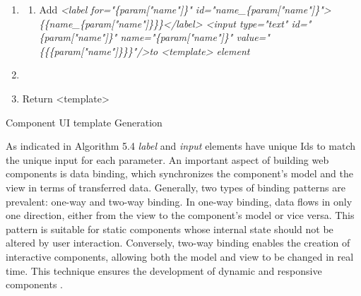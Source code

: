\setlength{\algomargin}{2em} %
\begin{algorithm}
	\DontPrintSemicolon
	\begin{enumerate}
	\item 
	{
		\begin{enumerate}
		\def\labelenumii{\alph{enumii}.}
		  \item
		    Add \emph{\textless label for="\{param{[}"name"{]}\}"
		    id="name\_\{param{[}"name"{]}\}"\textgreater\{\{name\_\{param{[}"name"{]}\}\}\}\textless/label\textgreater{} 
		    \emph{\textless input type="text" id="\{param{[}"name"{]}\}"
		    name="\{param{[}"name"{]}\}"
		    value="\{\{\{param{[}"name"{]}\}\}\}"/\textgreater{}}to
		    \textless template\textgreater{} element}
		\end{enumerate}
	}\label{endfor}
	
	\item 
	\label{endfor}
	
	\item 
		Return <template>
	\end{enumerate}
	
\caption{Component UI template Generation}\label{alg:ui-gen}
\end{algorithm}

As indicated in Algorithm 5.4
\emph{label} and \emph{input} elements have unique Ids to match the
unique input for each parameter. An important aspect of building web components is data binding, which
synchronizes the component's model and the view in terms
of transferred data. Generally, two types of binding patterns are
prevalent: one-way and two-way binding. In one-way binding, data flows
in only one direction, either from the view to the
component's model or vice versa. This pattern is
suitable for static components whose internal state should not be
altered by user interaction. Conversely, two-way binding enables the
creation of interactive components, allowing both the model and view to
be changed in real time. This technique ensures the development of
dynamic and responsive components \autocite{Rojas2021}.


